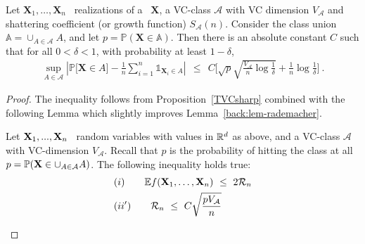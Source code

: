 \begin{corollary}
\label{back:cor_tvcsharp}
Let $\mathbf{X}_1,\ldots,\mathbf{X}_n$ \iid~realizations of a \rv~$\mathbf{X}$, a VC-class $\mathcal{A}$ with VC dimension $V_{\mathcal{A}}$ and shattering coefficient (or growth function) $S_{\mathcal{A}}(n)$.
Consider the class union $\mathbb{A} = \cup_{A \in \mathcal{A}} A$,
 and let  
$p = \mathbb{P}(\mathbf{X} \in \mathbb{A})$. Then there is an absolute constant $C$ such that for all $0<\delta<1$, with probability at least $1-\delta$,
\begin{align*}
\sup_{A \in \mathcal{A}} \left| \mathbb{P} \big[\mathbf{X} \in A\big] - \frac{1}{n} \sum_{i=1}^n \mathds{1}_{\mathbf{X}_i \in A}  \right| ~~\le~~ C \bigg[ \sqrt{p}\sqrt{\frac{V_{\mathcal{A}}}{n} \log{\frac{1}{\delta}}} + \frac{1}{n} \log{\frac{1}{\delta}} \bigg]~.
\end{align*}
\end{corollary}

\begin{proof}
The inequality follows from Proposition~\ref{TVCsharp} combined with the following Lemma which slightly improves Lemma~\ref{back:lem-rademacher}.

\begin{lemma}
\label{back:lem-relative-rademacher}
Let $\mathbf X_1,...,\mathbf X_n$ \iid~random variables with values in $\mathbb{R}^d$ as above, and a VC-class $\mathcal{A}$ with VC-dimension $V_{\mathcal{A}}$. Recall that $p$ is the probability of hitting the class at all $p= \mathbb{P}(\mathbf X \in \cup_{A \in \mathcal{A}}A)$.
The following inequality holds true:
\begin{align*}
&(i)~~~~~~  \mathbb{E}f(\mathbf X_1,\ldots,\mathbf X_n) ~\le~ 2 \mathcal{R}_n\\
&(ii')~~~~~~ \mathcal{R}_n ~\le~ C \sqrt{\frac{p V_{\mathcal{A}}}{n}}
\end{align*}
\end{lemma}
\end{proof}

